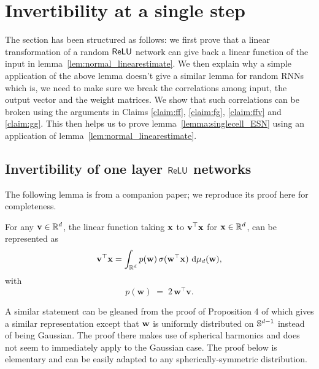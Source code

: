 \section{Invertibility at a single step}\label{sec:singlecell_RNN}
The section has been structured as follows: we first prove that a linear transformation of a random $\mathsf{ReLU}$ network can give back a linear function of the input in lemma~\ref{lem:normal_linearestimate}. We then explain why a simple application of the above lemma doesn't give a similar lemma for random RNNs which is, we need to make sure we break the correlations among input, the output vector and the weight matrices. We show that such correlations can be broken using the arguments in Claims \ref{claim:ff}, \ref{claim:fg}, \ref{claim:ffv} and \ref{claim:gg}. This then helps us to prove lemma~\ref{lemma:singlecell_ESN} using an application of lemma~\ref{lem:normal_linearestimate}.



\subsection{Invertibility of one layer $\mathsf{ReLU}$ networks}
The following lemma is from a companion paper; we reproduce its proof here for completeness. 
\begin{lemma}\label{lem:normal_linearestimate}
	For any $\mathbf{v} \in \mathbb{R}^d$, the linear function taking $\mathbf{x}$ to $\mathbf{v}^\top \mathbf{x}$ for $\mathbf{x} \in \mathbb{R}^d$, can be represented as
	\begin{equation}\label{eqn:single_layer_inversion_exact}
		\mathbf{v}^\top \mathbf{x} = \int_{\mathbb{R}^d} p(\mathbf{w}) \, \sigma(\mathbf{w}^{\top} \mathbf{x} ) \,\,\mathrm{d} \mu_d (\mathbf{w}),
	\end{equation}
	with 
	$$p\left(\mathbf{w}\right) \;=\;  2 \, \mathbf{w}^{\top} \mathbf{v}.$$ 
\end{lemma}
\begin{remark}
	A similar statement can be gleaned from the proof of Proposition 4 of \cite{bach2017breaking} which gives a similar representation except that 
	$\mathbf{w}$ is uniformly distributed on $\mathbb{S}^{d-1}$ instead of being Gaussian. The proof there makes use of spherical harmonics and does not seem to immediately apply to the Gaussian case. The proof below is elementary and can be easily adapted to any spherically-symmetric distribution. 
\end{remark}

